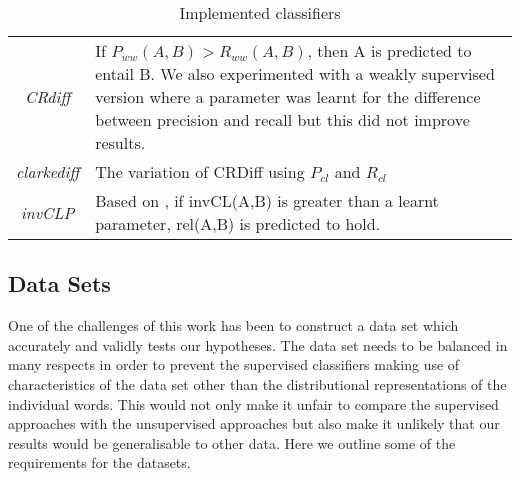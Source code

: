 \documentclass[11pt]{article}
\begin{document}
\begin{table*}[ht]
\begin{tabular}{|c|p{14cm}|}
\emph{CRdiff}& If $P_{ww}(A,B) > R_{ww}(A,B)$, then A is predicted to entail B.  We also experimented with a weakly supervised version where a parameter was learnt for the difference between precision and recall but this did not improve results.\\
\emph{clarkediff}& The \cite{Clarke2007} variation of CRDiff using $P_{cl}$ and $R_{cl}$\\
\emph{invCLP}& Based on \cite{Lenci2012}, if invCL(A,B) is greater than a learnt parameter, rel(A,B) is predicted to hold.\\
\hline
\end{tabular}
\caption{Implemented classifiers}
\label{table:classifiers}
\end{table*}

\subsection{Data Sets}

One of the challenges of this work has been to construct a data set which accurately and validly tests our hypotheses.  The data set needs to be balanced in many respects in order to prevent the supervised classifiers making use of characteristics of the data set other than the distributional representations of the individual words.  This would not only make it unfair to compare the supervised approaches with the unsupervised approaches but also make it unlikely that our results would be generalisable to other data.  Here we outline some of the requirements for the datasets.
\end{document}
